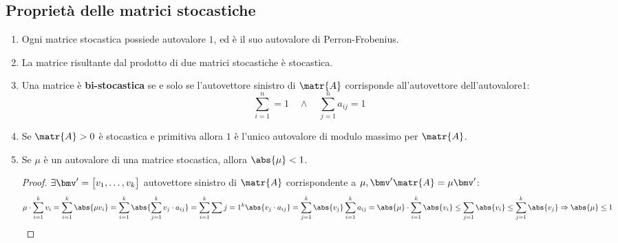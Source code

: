 \documentclass[\main/main.tex]{subfiles}
\begin{document}
\subsection{Proprietà delle matrici stocastiche}
\begin{enumerate}
  \item Ogni matrice stocastica possiede autovalore \(1\), ed è il suo autovalore di
        Perron-Frobenius.
  \item La matrice risultante dal prodotto di due matrici stocastiche è stocastica.
  \item Una matrice è \textbf{bi-stocastica} se e solo se l'autovettore sinistro di \(\matr{A}\) corrisponde all'autovettore dell'autovalore\(1\):
        \[
          \sum_{i=1}^n = 1 \quad \land \quad \sum_{j=1}^n a_{ij} = 1
        \]
  \item Se \(\matr{A} > 0\) è stocastica e primitiva allora \(1\) è l'unico autovalore di modulo massimo per \(\matr{A}\).
  \item Se \(\mu \) è un autovalore di una matrice stocastica, allora \(\abs{\mu} < 1\).
        \begin{proof}
          \(\exists \bmv' = \begin{bmatrix}
            v_1, \ldots, v_k
          \end{bmatrix}\) autovettore sinistro di \(\matr{A}\) corrispondente a \(\mu, \bmv' \matr{A} = \mu \bmv'\):
          \[
            \mu \cdot \sum_{i=1}^k v_i = \sum_{i=1}^k \abs{\mu v_i} = \sum_{i=1}^k \abs{\sum_{j=1}^k v_j\cdot a_{ij}} = \sum_{i=1}^k \sum{j=1}^k \abs{v_j \cdot a_{ij}} = \sum_{j=1}^k \abs{v_j} \sum_{i=1}^k a_{ij} = \abs{\mu} \cdot \sum_{i=1}^k \abs{v_i} \leq \sum_{j=1} \abs{v_i} \leq \sum_{j=1}^k \abs{v_j} \Rightarrow \abs{\mu} \leq 1
          \]
        \end{proof}
\end{enumerate}
\end{document}
